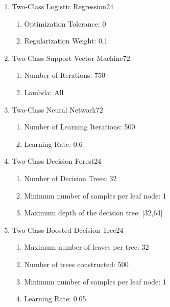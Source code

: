 \begin{enumerate}
    \item{Two-Class Logistic Regression}24
    
    \begin{enumerate}
        \item{Optimization Tolerance:} 0
        \item{Regularization Weight:} 0.1
    \end{enumerate}
    
    \item{Two-Class Support Vector Machine}72
    
    \begin{enumerate}
        \item{Number of Iterations:} 750
        \item{Lambda:} All
    \end{enumerate}
    
    \item{Two-Class Neural Network}72
    
    \begin{enumerate}
        \item{Number of Learning Iterations:} 500
        \item{Learning Rate:} 0.6
    \end{enumerate}
    
    \item{Two-Class Decision Forest}24

    \begin{enumerate}
        \item{Number of Decision Trees:} 32
        \item{Minimum number of samples per leaf node:} 1
        \item{Maximum depth of the decision tree:} [32,64]
    \end{enumerate}
    
    \item{Two-Class Boosted Decision Tree}24
    
    \begin{enumerate}
        \item{Maximum number of leaves per tree:} 32
        \item{Number of trees constructed:} 500
        \item{Minimum number of samples per leaf node:} 1
        \item{Learning Rate:} 0.05
    \end{enumerate}
    
\end{enumerate}

